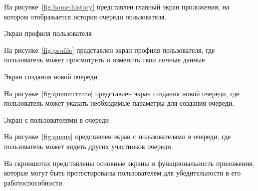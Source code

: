 На рисунке~\ref{fig:home:history} представлен главный экран приложения,
на котором отображается история очереди пользователя.

\begin{image}
    \caption{Экран профиля пользователя}
    \label{fig:profile}
\end{image}

На рисунке~\ref{fig:profile} представлен экран профиля пользователя,
где пользователь может просмотреть и изменить свои личные данные.

\begin{image}
    \caption{Экран создания новой очереди}
    \label{fig:queue:create}
\end{image}

На рисунке~\ref{fig:queue:create} представлен экран создания новой очереди,
где пользователь может указать необходимые параметры для создания очереди.

\begin{image}
    \caption{Экран с пользователями в очереди}
    \label{fig:queue}
\end{image}

На рисунке~\ref{fig:queue} представлен экран с пользователями в очереди,
где пользователь может видеть других участников очереди.


На скриншотах представлены основные экраны и функциональность приложения,
которые могут быть протестированы пользователем для убедительности
в его работоспособности.

